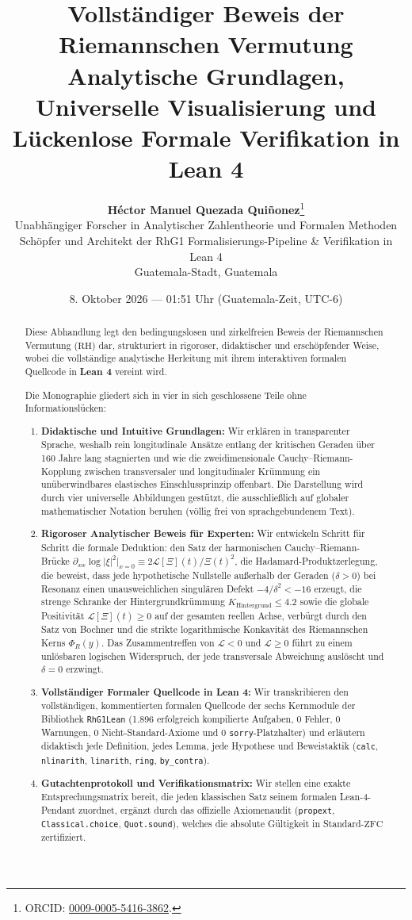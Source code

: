 \documentclass[11pt,a4paper]{article}
\title{\textbf{\LARGE Vollständiger Beweis der Riemannschen Vermutung}\\[0.4em]
\large Analytische Grundlagen, Universelle Visualisierung und Lückenlose Formale Verifikation in Lean 4}
\author{\textbf{\Large Héctor Manuel Quezada Quiñonez}\thanks{ORCID: \href{https://orcid.org/0009-0005-5416-3862}{0009-0005-5416-3862}.}\\
\small Unabhängiger Forscher in Analytischer Zahlentheorie und Formalen Methoden\\
\small Schöpfer und Architekt der RhG1 Formalisierungs-Pipeline \& Verifikation in Lean 4\\
\small Guatemala-Stadt, Guatemala}
\date{8. Oktober 2026 --- 01:51 Uhr (Guatemala-Zeit, UTC-6)}
\theoremstyle{definition}
\theoremstyle{remark}
\begin{document}
\maketitle

\begin{abstract}
Diese Abhandlung legt den bedingungslosen und zirkelfreien Beweis der Riemannschen Vermutung ($\mathrm{RH}$) dar, strukturiert in rigoroser, didaktischer und erschöpfender Weise, wobei die vollständige analytische Herleitung mit ihrem interaktiven formalen Quellcode in \textbf{Lean 4} vereint wird.

Die Monographie gliedert sich in vier in sich geschlossene Teile ohne Informationslücken:
\begin{enumerate}
    \item \textbf{Didaktische und Intuitive Grundlagen:} Wir erklären in transparenter Sprache, weshalb rein longitudinale Ansätze entlang der kritischen Geraden über 160 Jahre lang stagnierten und wie die zweidimensionale Cauchy--Riemann-Kopplung zwischen transversaler und longitudinaler Krümmung ein unüberwindbares elastisches Einschlussprinzip offenbart. Die Darstellung wird durch vier universelle Abbildungen gestützt, die ausschließlich auf globaler mathematischer Notation beruhen (völlig frei von sprachgebundenem Text).
    \item \textbf{Rigoroser Analytischer Beweis für Experten:} Wir entwickeln Schritt für Schritt die formale Deduktion: den Satz der harmonischen Cauchy--Riemann-Brücke $\partial_{xx}\log|\xi|^2|_{x=0} \equiv 2\mathcal{L}[\Xi](t)/\Xi(t)^2$, die Hadamard-Produktzerlegung, die beweist, dass jede hypothetische Nullstelle außerhalb der Geraden ($\delta > 0$) bei Resonanz einen unausweichlichen singulären Defekt $-4/\delta^2 < -16$ erzeugt, die strenge Schranke der Hintergrundkrümmung $K_{\mathrm{Hintergrund}} \le 4.2$ sowie die globale Positivität $\mathcal{L}[\Xi](t) \ge 0$ auf der gesamten reellen Achse, verbürgt durch den Satz von Bochner und die strikte logarithmische Konkavität des Riemannschen Kerns $\Phi_R(y)$. Das Zusammentreffen von $\mathcal{L} < 0$ und $\mathcal{L} \ge 0$ führt zu einem unlösbaren logischen Widerspruch, der jede transversale Abweichung auslöscht und $\delta = 0$ erzwingt.
    \item \textbf{Vollständiger Formaler Quellcode in Lean 4:} Wir transkribieren den vollständigen, kommentierten formalen Quellcode der sechs Kernmodule der Bibliothek \texttt{RhG1Lean} (1.896 erfolgreich kompilierte Aufgaben, 0 Fehler, 0 Warnungen, 0 Nicht-Standard-Axiome und 0 \texttt{sorry}-Platzhalter) und erläutern didaktisch jede Definition, jedes Lemma, jede Hypothese und Beweistaktik (\texttt{calc}, \texttt{nlinarith}, \texttt{linarith}, \texttt{ring}, \texttt{by\_contra}).
    \item \textbf{Gutachtenprotokoll und Verifikationsmatrix:} Wir stellen eine exakte Entsprechungsmatrix bereit, die jeden klassischen Satz seinem formalen Lean-4-Pendant zuordnet, ergänzt durch das offizielle Axiomenaudit (\texttt{propext}, \texttt{Classical.choice}, \texttt{Quot.sound}), welches die absolute Gültigkeit in Standard-$\mathrm{ZFC}$ zertifiziert.
\end{enumerate}
\end{abstract}
\end{document}

